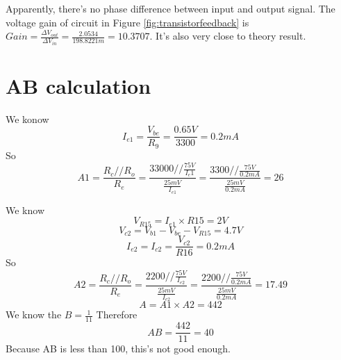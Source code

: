Apparently, there's no phase difference between input and output signal. 
The voltage gain of circuit in Figure \ref{fig:transistorfeedback} is $ Gain = \frac{\Delta V_{out}}{\Delta V_{in}} = \frac{2.0534}{198.8221m} = 10.3707$. It's also very close to theory result.
 
 
\section{AB calculation}
We konow
\[ I_{e1} =\frac{V_{be}}{R_9}=\frac{0.65V}{3300}=0.2mA\]
So
\[ A1=\frac{R_c//R_o}{R_e}=\frac{33000//\frac{75V}{I_e1}}{\frac{25mV}{I_{e1}}}=\frac{3300//\frac{75V}{0.2mA}}{\frac{25mV}{0.2mA}}=26\]

We know
\[ V_{R15}=I_{e1}\times R15=2V\]
\[V_{c2}=V_{b1}-V_{be}-V_{R15}=4.7V\]
\[I_{e2}=I_{c2}=\frac{V_{c2}}{R16}=0.2mA\]
So
\[ A2=\frac{R_c//R_o}{R_e}=\frac{2200//\frac{75V}{I_{e2}}}{\frac{25mV}{I_{e2}}
}=\frac{2200//\frac{75V}{0.2mA}}{\frac{25mV}{0.2mA}}=17.49\]
\[A=A1\times A2=442\]
We know the $B=\frac{1}{11}$
Therefore
\[AB=\frac{442}{11}=40\]
Because AB is less than 100, this's not good enough.